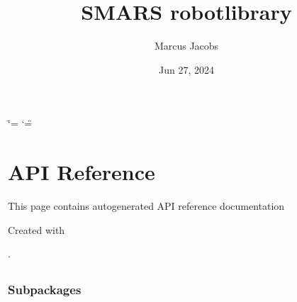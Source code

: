 \documentclass[letterpaper,10pt,english]{sphinxmanual}
\title{SMARS robotlibrary}
\date{Jun 27, 2024}
\author{Marcus Jacobs}
\begin{document}
\ifdefined\shorthandoff
  \ifnum\catcode`\=\string=\active\shorthandoff{=}\fi
  \ifnum\catcode`\"=\active{}\fi
\fi

\pagestyle{empty}
\sphinxmaketitle
\pagestyle{plain}
\sphinxtableofcontents
\pagestyle{normal}
\label{\detokenize{index::doc}}


\sphinxstepscope


\chapter{API Reference}
\label{\detokenize{autoapi/index:api-reference}}\label{\detokenize{autoapi/index::doc}}
\sphinxAtStartPar
This page contains auto\sphinxhyphen{}generated API reference documentation %
\begin{footnote}[1]\sphinxAtStartFootnote
Created with 
%
\end{footnote}.

\sphinxstepscope


\section{}
\label{\detokenize{autoapi/robotlibrary/index:module-robotlibrary}}\label{\detokenize{autoapi/robotlibrary/index:robotlibrary}}\label{\detokenize{autoapi/robotlibrary/index::doc}}

\subsection{Subpackages}
\label{\detokenize{autoapi/robotlibrary/index:subpackages}}
\sphinxstepscope


\subsubsection{}
\label{\detokenize{autoapi/robotlibrary/bluetooth/index:module-robotlibrary.bluetooth}}\label{\detokenize{autoapi/robotlibrary/bluetooth/index:robotlibrary-bluetooth}}\label{\detokenize{autoapi/robotlibrary/bluetooth/index::doc}}
\end{document}
